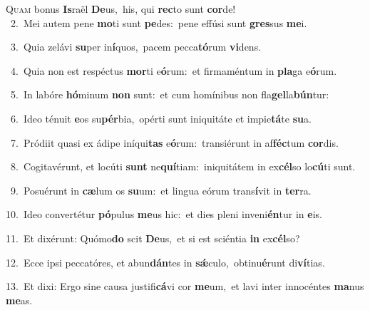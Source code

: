 \lettrine{\initial\textcolor{\initialcolor}{Q}}{uam} bonus \textbf{Is}\-raël \textbf{De}\-us,~\star his, qui \textbf{rec}\-to sunt \textbf{cor}\-de!\\
{\numbfont\textcolor{\numbcolor}{~2.}}~Mei autem pene \textbf{mo}\-ti sunt \textbf{pe}\-des:~\star pene effúsi sunt \textbf{gres}\-sus \textbf{me}\-i.\par
{\numbfont\textcolor{\numbcolor}{~3.}}~Quia zelávi \textbf{su}\-per in\-\textbf{í}\-quos,~\star pacem pecca\-\textbf{tó}\-rum \textbf{vi}\-dens.\par
{\numbfont\textcolor{\numbcolor}{~4.}}~Quia non est respéctus \textbf{mor}\-ti e\-\textbf{ó}\-rum:~\star et firmaméntum in \textbf{pla}\-ga e\-\textbf{ó}\-rum.\par
{\numbfont\textcolor{\numbcolor}{~5.}}~In labóre \textbf{hó}\-minum \textbf{non} sunt:~\star et cum homínibus non fla\-\textbf{gel}\-la\-\textbf{bún}\-tur:\par
{\numbfont\textcolor{\numbcolor}{~6.}}~Ideo ténuit \textbf{e}\-os su\-\textbf{pér}\-bia,~\star opérti sunt iniquitáte et impie\-\textbf{tá}\-te \textbf{su}\-a.\par
{\numbfont\textcolor{\numbcolor}{~7.}}~Pródiit quasi ex ádipe iníqui\textbf{tas} e\-\textbf{ó}\-rum:~\star transiérunt in af\-\textbf{féc}\-tum \textbf{cor}\-dis.\par
{\numbfont\textcolor{\numbcolor}{~8.}}~Cogitavérunt, et locúti \textbf{sunt} ne\-\textbf{quí}\-tiam:~\star iniquitátem in ex\-\textbf{cél}\-so lo\-\textbf{cú}\-ti sunt.\par
{\numbfont\textcolor{\numbcolor}{~9.}}~Posuérunt in \textbf{cæ}\-lum os \textbf{su}\-um:~\star et lingua eórum trans\-\textbf{í}\-vit in \textbf{ter}\-ra.\par
{\numbfont\textcolor{\numbcolor}{10.}}~Ideo convertétur \textbf{pó}\-pulus \textbf{me}\-us hic:~\star et dies pleni inveni\-\textbf{én}\-tur in \textbf{e}\-is.\par
{\numbfont\textcolor{\numbcolor}{11.}}~Et dixérunt: Quómo\textbf{do} scit \textbf{De}\-us,~\star et si est sciéntia \textbf{in} ex\-\textbf{cél}\-so?\par
{\numbfont\textcolor{\numbcolor}{12.}}~Ecce ipsi peccatóres, et abun\-\textbf{dán}\-tes in \textbf{sǽ}\-culo,~\star obtinu\-\textbf{é}\-runt di\-\textbf{ví}\-tias.\par
{\numbfont\textcolor{\numbcolor}{13.}}~Et dixi: Ergo sine causa justifi\-\textbf{cá}\-vi cor \textbf{me}\-um,~\star et lavi inter innocéntes \textbf{ma}\-nus \textbf{me}\-as.\par
